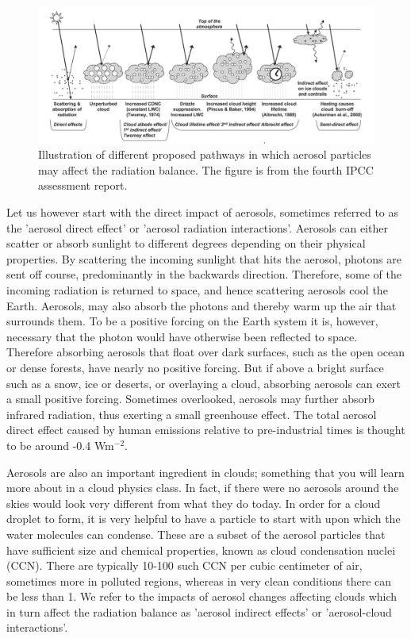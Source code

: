 \documentclass[12pt]{book}
\begin{document}
\begin{figure}
	\begin{center}
		\includegraphics[width=\textwidth]{../external_figures/AR4_aerosol_effects}
	\end{center}
	\caption{ Illustration of different proposed pathways in which aerosol particles may affect the radiation balance. The figure is from the fourth IPCC assessment report. } 
	\label{fig:ar4aerosols}
\end{figure}

Let us however start with the direct impact of aerosols, sometimes referred to as the 'aerosol direct effect' or 'aerosol radiation interactions'. Aerosols can either scatter or absorb sunlight to different degrees depending on their physical properties. By scattering the incoming sunlight that hits the aerosol, photons are sent off course, predominantly in the backwards direction. Therefore, some of the incoming radiation is returned to space, and hence scattering aerosols cool the Earth. Aerosols, may also absorb the photons and thereby warm up the air that surrounds them. To be a positive forcing on the Earth system it is, however, necessary that the photon would have otherwise been reflected to space. Therefore absorbing aerosols that float over dark surfaces, such as the open ocean or dense forests, have nearly no positive forcing. But if above a bright surface such as a snow, ice or deserts, or overlaying a cloud, absorbing aerosols can exert a small positive forcing. Sometimes overlooked, aerosols may further absorb infrared radiation, thus exerting a small greenhouse effect. The total aerosol direct effect caused by human emissions relative to pre-industrial times is thought to be around -0.4 Wm$^{-2}$.

Aerosols are also an important ingredient in clouds; something that you will learn more about in a cloud physics class. In fact, if there were no aerosols around the skies would look very different from what they do today. In order for a cloud droplet to form, it is very helpful to have a particle to start with upon which the water molecules can condense. These are a subset of the aerosol particles that have sufficient size and chemical properties, known as cloud condensation nuclei (CCN). There are typically 10-100 such CCN per cubic centimeter of air, sometimes more in polluted regions, whereas in very clean conditions there can be less than 1. We refer to the impacts of aerosol changes affecting clouds which in turn affect the radiation balance as 'aerosol indirect effects' or 'aerosol-cloud interactions'. 
\end{document}
